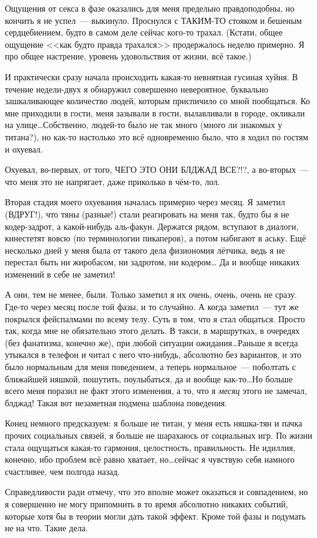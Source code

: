\documentclass[a4paper,14pt,oneside]{memoir}
\begin{document}
\begin{shaded}
Ощущения от секса в фазе оказались для меня предельно правдоподобны, но кончить я не успел~--- выкинуло. Проснулся с ТАКИМ-ТО стояком и бешеным сердцебиением, будто в самом деле сейчас кого-то трахал. (Кстати, общее ощущение <<как будто правда трахался>> продержалось неделю примерно. Я про общее настрение, уровень удовольствия от жизни, всё такое.)

И практически сразу начала происходить какая-то невнятная гусиная хуйня. В течение недели-двух я обнаружил совершенно невероятное, буквально зашкаливающее количество людей, которым приспичило со мной пообщаться. Ко мне приходили в гости, меня зазывали в гости, вылавливали в городе, окликали на улице\ldots Собственно, людей-то было не так много (много ли знакомых у титана?), но как-то настолько это всё одновременно было, что я ходил по гостям и охуевал. 

Охуевал, во-первых, от того, ЧЕГО ЭТО ОНИ БЛДЖАД ВСЕ?!?, а во-вторых~--- что меня это не напрягает, даже приколько в чём-то, лол.

Вторая стадия моего охуевания началась примерно через месяц. Я заметил (ВДРУГ!), что тяны (разные!) стали реагировать на меня так, будто бы я не кодер-задрот, а какой-нибудь аль-факун. Держатся рядом, вступают в диалоги, кинестетят вовсю (по терминологии пикаперов), а потом набигают в аську. Ещё несколько дней у меня была от такого дела физиономия лётчика, ведь я не перестал быть ни жиробасом, ни задротом, ни кодером… Да и вообще никаких изменений в себе не заметил!

А они, тем не менее, были. Только заметил я их очень, очень, очень не сразу. Где-то через месяц после той фазы, и то случайно. А когда заметил~--- тут же покрылся фейспалмами по всему телу. Суть в том, что я стал общаться. Просто так, когда мне не обязательно этого делать. В такси, в маршрутках, в очередях (без фанатизма, конечно же), при любой ситуации ожидания\ldots Раньше я всегда утыкался в телефон и читал с него что-нибудь, абсолютно без вариантов, и это было нормальным для меня поведением, а теперь нормальное~--- поболтать с ближайшей няшкой, пошутить, поулыбаться, да и вообще как-то\ldots Но больше всего меня поразил не факт этого изменения, а то, что я \textit{месяц} этого не замечал, блджад! Такая вот незаметная подмена шаблона поведения.

Конец немного предсказуем: я больше не титан, у меня есть няшка-тян и пачка прочих социальных связей, я больше не шарахаюсь от социальных игр. По жизни стала ощущаться какая-то гармония, целостность, правильность. Не идиллия, конечно, ибо проблем всё равно хватает, но\ldots сейчас я чувствую себя намного счастливее, чем полгода назад.

Справедливости ради отмечу, что это вполне может оказаться и совпадением, но я совершенно не могу припомнить в то время абсолютно никаких событий, которые хотя бы в теории могли дать такой эффект. Кроме той фазы и подумать не на что. Такие дела.
\end{shaded}
\end{document}
